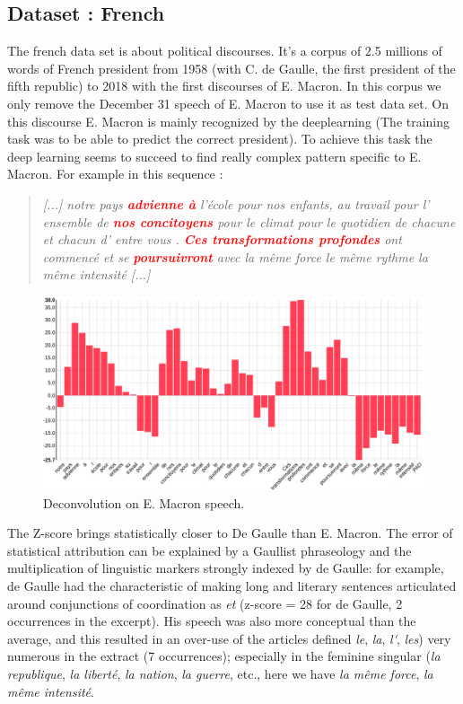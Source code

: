 \subsection{Dataset : French}

The french data set is about political discourses. It's a corpus of 2.5 millions of words of French president from 1958 (with C. de Gaulle, the first president of the fifth republic) to 2018 with the first discourses of E. Macron. In this corpus we only remove the December 31 speech of E. Macron to use it as test data set. On this discourse E. Macron is mainly recognized by the deeplearning (The training task was to be able to predict the correct president). To achieve this task the deep learning seems to succeed to find really complex pattern specific to E. Macron. For example in this sequence :

\begin{quote}
\textit{[...] notre pays \textcolor{red}{\textbf{advienne à}} l'école pour nos enfants, au travail pour l' ensemble de \textcolor{red}{\textbf{nos concitoyens}} pour le climat pour le quotidien de chacune et chacun d' entre vous . \textcolor{red}{\textbf{Ces transformations profondes}} ont commencé et se \textcolor{red}{\textbf{poursuivront}} avec la même force le même rythme la même intensité [...]} 
\end{quote}

\begin{figure}[h]
\begin{center}
\includegraphics[width=16cm]{img/macron_activation.png}
\caption{Deconvolution on E. Macron speech.}
\label{macron_activation}
\end{center}
\end{figure}

The Z-score brings statistically closer to De Gaulle than E. Macron. The error of statistical attribution can be explained by a Gaullist phraseology and the multiplication of linguistic markers strongly indexed by de Gaulle: for example, de Gaulle had the characteristic of making long and literary sentences articulated around conjunctions of coordination as \textit{et} (z-score = 28 for de Gaulle, 2 occurrences in the excerpt). His speech was also more conceptual than the average, and this resulted in an over-use of the articles defined \textit{le}, \textit{la}, \textit{l\'}, \textit{les}) very numerous in the extract (7 occurrences); especially in the feminine singular (\textit{la republique}, \textit{la liberté}, \textit{la nation}, \textit{la guerre}, etc., here we have \textit{la même force}, \textit{la même intensité}.

